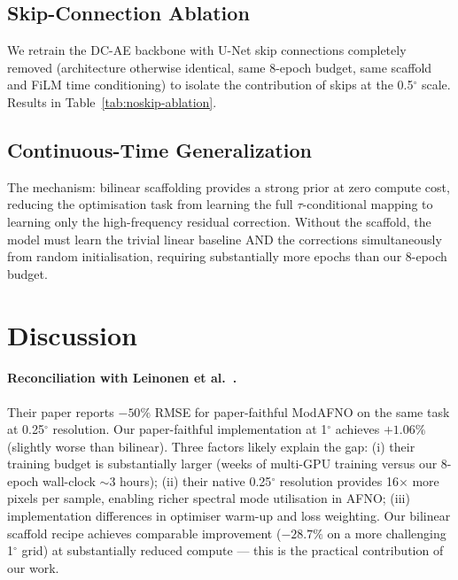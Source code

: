 \documentclass[10pt,letterpaper,twocolumn]{article}
\begin{document}


\subsection{Skip-Connection Ablation}
\label{sec:noskip-ablation}

We retrain the DC-AE backbone with U-Net skip connections completely
removed (architecture otherwise identical, same 8-epoch budget, same
scaffold and FiLM time conditioning) to isolate the contribution of
skips at the 0.5$^\circ$ scale. Results in Table~\ref{tab:noskip-ablation}.



\subsection{Continuous-Time Generalization}
\label{sec:continuous-time-gen}



The mechanism: bilinear scaffolding provides a strong prior at zero compute
cost, reducing the optimisation task from learning the full $\tau$-conditional
mapping to learning only the high-frequency residual correction. Without
the scaffold, the model must learn the trivial linear baseline AND the
corrections simultaneously from random initialisation, requiring substantially
more epochs than our 8-epoch budget.



\section{Discussion}
\label{sec:discussion}

\paragraph{Reconciliation with Leinonen et al.\ \cite{leinonen2024modafno}.}
Their paper reports $-50\%$ RMSE for paper-faithful ModAFNO on the same task
at 0.25$^\circ$ resolution. Our paper-faithful implementation at 1$^\circ$
achieves $+1.06\%$ (slightly worse than bilinear). Three factors likely
explain the gap: (i) their training budget is substantially larger
(weeks of multi-GPU training versus our 8-epoch wall-clock $\sim$3 hours);
(ii) their native 0.25$^\circ$ resolution provides 16$\times$ more pixels per
sample, enabling richer spectral mode utilisation in AFNO; (iii) implementation
differences in optimiser warm-up and loss weighting. Our bilinear scaffold
recipe achieves comparable improvement ($-28.7\%$ on a more challenging
1$^\circ$ grid) at substantially reduced compute --- this is the practical
contribution of our work.
\end{document}
